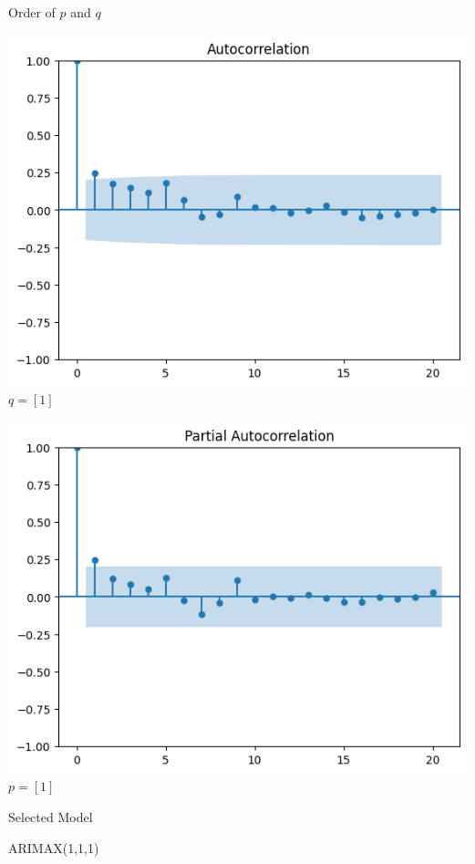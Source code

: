 \documentclass[12pt, aspectratio=169]{beamer}
\begin{document}
\begin{frame}{Order of $p$ and $q$}
        \begin{minipage}{0.48\textwidth}
        \centering
        \includegraphics[width=\linewidth]{acf.png}
        $q = [1]$
    \end{minipage}
    \hfill
    \begin{minipage}{0.48\textwidth}
        \centering
        \includegraphics[width=\linewidth]{pacf.png}
            $p = [1]$ 
    \end{minipage}
\end{frame}

\begin{frame}{Selected Model}
        \begin{tcolorbox}[colframe=theme, colback=theme]
        \begin{center}
            \Huge{ARIMAX(1,1,1)}
        \end{center}
    \end{tcolorbox}
\end{frame}
\end{document}
